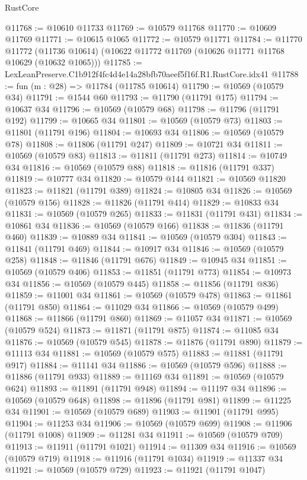 \begin{lexlean}{RustCore}
\begin{coremodule}
@11768 := @10610 @11733
@11769 := @10579 @11768
@11770 := @10609 @11769
@11771 := @10615 @1065
@11772 := @10579 @11771
@11784 := @11770
    @11772
    (@11736 @10614)
    (@10622 @11772 @11769 (@10626 @11771 @11768 @10629 (@10632 @1065)))
@11785 := LexLeanPreserve.C1b912f4fc4d4e14a28bfb70aeef5f16f.R1.RustCore.idx41
@11788 := fun (m : @28) => @11784 (@11785 @10614)
@11790 := @10569 (@10579 @34)
@11791 := @1544 @60
@11793 := @11790 (@11791 @175)
@11794 := @10637 @34
@11796 := @10569 (@10579 @68)
@11798 := @11796 (@11791 @192)
@11799 := @10665 @34
@11801 := @10569 (@10579 @73)
@11803 := @11801 (@11791 @196)
@11804 := @10693 @34
@11806 := @10569 (@10579 @78)
@11808 := @11806 (@11791 @247)
@11809 := @10721 @34
@11811 := @10569 (@10579 @83)
@11813 := @11811 (@11791 @273)
@11814 := @10749 @34
@11816 := @10569 (@10579 @88)
@11818 := @11816 (@11791 @337)
@11819 := @10777 @34
@11820 := @10579 @144
@11821 := @10569 @11820
@11823 := @11821 (@11791 @389)
@11824 := @10805 @34
@11826 := @10569 (@10579 @156)
@11828 := @11826 (@11791 @414)
@11829 := @10833 @34
@11831 := @10569 (@10579 @265)
@11833 := @11831 (@11791 @431)
@11834 := @10861 @34
@11836 := @10569 (@10579 @166)
@11838 := @11836 (@11791 @460)
@11839 := @10889 @34
@11841 := @10569 (@10579 @304)
@11843 := @11841 (@11791 @469)
@11844 := @10917 @34
@11846 := @10569 (@10579 @258)
@11848 := @11846 (@11791 @676)
@11849 := @10945 @34
@11851 := @10569 (@10579 @406)
@11853 := @11851 (@11791 @773)
@11854 := @10973 @34
@11856 := @10569 (@10579 @445)
@11858 := @11856 (@11791 @836)
@11859 := @11001 @34
@11861 := @10569 (@10579 @478)
@11863 := @11861 (@11791 @850)
@11864 := @11029 @34
@11866 := @10569 (@10579 @499)
@11868 := @11866 (@11791 @860)
@11869 := @11057 @34
@11871 := @10569 (@10579 @524)
@11873 := @11871 (@11791 @875)
@11874 := @11085 @34
@11876 := @10569 (@10579 @545)
@11878 := @11876 (@11791 @890)
@11879 := @11113 @34
@11881 := @10569 (@10579 @575)
@11883 := @11881 (@11791 @917)
@11884 := @11141 @34
@11886 := @10569 (@10579 @596)
@11888 := @11886 (@11791 @933)
@11889 := @11169 @34
@11891 := @10569 (@10579 @624)
@11893 := @11891 (@11791 @948)
@11894 := @11197 @34
@11896 := @10569 (@10579 @648)
@11898 := @11896 (@11791 @981)
@11899 := @11225 @34
@11901 := @10569 (@10579 @689)
@11903 := @11901 (@11791 @995)
@11904 := @11253 @34
@11906 := @10569 (@10579 @699)
@11908 := @11906 (@11791 @1008)
@11909 := @11281 @34
@11911 := @10569 (@10579 @709)
@11913 := @11911 (@11791 @1021)
@11914 := @11309 @34
@11916 := @10569 (@10579 @719)
@11918 := @11916 (@11791 @1034)
@11919 := @11337 @34
@11921 := @10569 (@10579 @729)
@11923 := @11921 (@11791 @1047)

\end{coremodule}
\end{lexlean}
